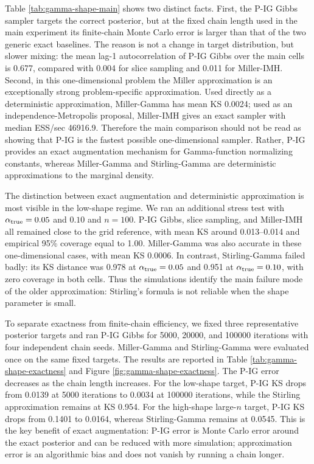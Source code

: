 Table \ref{tab:gamma-shape-main} shows two distinct facts.  First, the P-IG
Gibbs sampler targets the correct posterior, but at the fixed chain length used
in the main experiment its finite-chain Monte Carlo error is larger than that
of the two generic exact baselines.  The reason is not a change in target
distribution, but slower mixing: the mean lag-1 autocorrelation of P-IG Gibbs
over the main cells is 0.677, compared with 0.004 for slice sampling and 0.011
for Miller-IMH.  Second, in this one-dimensional problem the Miller
approximation is an exceptionally strong problem-specific approximation.  Used
directly as a deterministic approximation, Miller-Gamma has mean KS 0.0024;
used as an independence-Metropolis proposal, Miller-IMH gives an exact sampler
with median ESS/sec 46916.9.  Therefore the main comparison should not be read
as showing that P-IG is the fastest possible one-dimensional sampler.  Rather,
P-IG provides an exact augmentation mechanism for Gamma-function normalizing
constants, whereas Miller-Gamma and Stirling-Gamma are deterministic
approximations to the marginal density.

The distinction between exact augmentation and deterministic approximation is
most visible in the low-shape regime.  We ran an additional stress test with
$\alpha_{\rm true}=0.05$ and $0.10$ and $n=100$.  P-IG Gibbs, slice sampling,
and Miller-IMH all remained close to the grid reference, with mean KS around
0.013--0.014 and empirical 95\% coverage equal to 1.00.  Miller-Gamma was also
accurate in these one-dimensional cases, with mean KS 0.0006.  In contrast,
Stirling-Gamma failed badly: its KS distance was 0.978 at
$\alpha_{\rm true}=0.05$ and 0.951 at $\alpha_{\rm true}=0.10$, with zero
coverage in both cells.  Thus the simulations identify the main failure mode
of the older approximation: Stirling's formula is not reliable when the shape
parameter is small.

To separate exactness from finite-chain efficiency, we fixed three
representative posterior targets and ran P-IG Gibbs for 5000, 20000, and
100000 iterations with four independent chain seeds.  Miller-Gamma and
Stirling-Gamma were evaluated once on the same fixed targets.  The results are
reported in Table \ref{tab:gamma-shape-exactness} and Figure
\ref{fig:gamma-shape-exactness}.  The P-IG error decreases as the chain length
increases.  For the low-shape target, P-IG KS drops from 0.0139 at 5000
iterations to 0.0034 at 100000 iterations, while the Stirling approximation
remains at KS 0.954.  For the high-shape large-$n$ target, P-IG KS drops from
0.1401 to 0.0164, whereas Stirling-Gamma remains at 0.0545.  This is the key
benefit of exact augmentation: P-IG error is Monte Carlo error around the exact
posterior and can be reduced with more simulation; approximation error is an
algorithmic bias and does not vanish by running a chain longer.

